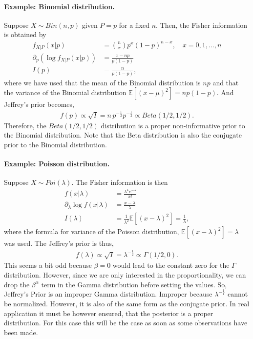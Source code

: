 \paragraph{Example: Binomial distribution.}Suppose $X\sim Bin(n,p)$ given $P=p$ for a fixed $n$. Then, the Fisher information is obtained by
\begin{align*}
f_{X|P}(x|p) &=  \binom {n} {x} p^x (1-p)^{n-x}, \quad x=0,1,\dots, n \\
\partial_p(\log f_{X|P}(x|p)) &= \frac{x-np}{p(1-p)} \\
I(p) &= \frac{n}{p(1-p)},
\end{align*}
where we have used that the mean of the Binomial distribution is $np$ and that the variance of the Binomial distribution $\mathbb{E}\left[(x-\mu)^2\right] = np(1-p)$.
And Jeffrey's prior becomes,
\begin{align*}
f(p) \propto \sqrt{I} = n\, p^{-\frac{1}{2}}p^{-\frac{1}{2}} \propto Beta\left(1/2,1/2\right).
\end{align*}
Therefore, the $Beta(1/2, 1/2)$ distribution is a proper non-informative prior to the Binomial distribution. Note that the Beta distribution is also the conjugate prior to the Binomial distribution.

\paragraph*{Example: Poisson distribution.} Suppose $X\sim Poi(\lambda)$. The Fisher information is then 
\begin{align*}
f(x|\lambda) &= \frac{\lambda ^xe^{-\lambda}}{x!} \\
\partial_\lambda \log f(x|\lambda)  &=  \frac{x-\lambda}{\lambda} \\
I(\lambda) &= \frac{1}{\lambda^2}\mathbb{E}\left[(x-\lambda)^2\right] = \frac{1}{\lambda},
\end{align*}
where the formula for variance of the Poisson distribution, $\mathbb{E}\left[(x-\lambda)^2  \right] = \lambda$ was used. The Jeffrey's prior is thus,
\begin{align*}
f(\lambda) \propto \sqrt{I} = \lambda^{-\frac{1}{2}} \propto \Gamma(1/2, 0).
\end{align*}
This seems a bit odd because $\beta=0$ would lead to the constant zero for the $\Gamma$ distribution. However, since we are only interested in the proportionality, we can drop the $\beta^\alpha$ term in the Gamma distribution before setting the values. So, Jeffrey's Prior is an improper Gamma distribution. Improper because $\lambda^{-\frac{1}{1}}$ cannot be normalized. However, it is also of the same form as the conjugate prior. In real application it must be however ensured, that the posterior is a proper distribution. For this case this will be the case as soon as some observations have been made.

